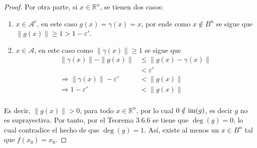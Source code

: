 \documentclass[12pt]{report}
\theoremstyle{largebreak}
\begin{document}
\begin{proof}
    Por otra parte, si $x\in\mathbb{R}^n$, se tienen dos casos:
    \begin{enumerate}
        \item $x\in\mathcal{A}^c$, en este caso $g(x)=\gamma(x)=x$, por ende como $x\notin B^n$ se sigue que $\|g(x)\|\geq1>1-\varepsilon'$.
        \item $x\in\mathcal{A}$, en este caso como $\|\gamma(x)\|\geq1$ se sigue que
        \begin{equation*}
            \begin{split}
                \|\gamma(x)\|-\|g(x)\|&\leq\|g(x)-\gamma(x)\|\\
                &<\varepsilon'\\
                \Rightarrow \|\gamma(x)\|-\varepsilon'&<\|g(x)\|\\
                \Rightarrow 1-\varepsilon'&<\|g(x)\|\\
            \end{split}
        \end{equation*}
    \end{enumerate}
    Es decir, $\|g(x)\|>0$, para todo $x\in\mathbb{R}^n$, por lo cual $0\notin \textup{im}(g)$, es decir $g$ no es suprayectiva. Por tanto, por el Teorema 3.6.6 se tiene que $\deg(g)=0$, lo cual contradice el hecho de que $\deg(g)=1$.
    Así, existe al menos un $x\in B^n$ tal que $f(x_0)=x_0$.
\end{proof}
\end{document}
